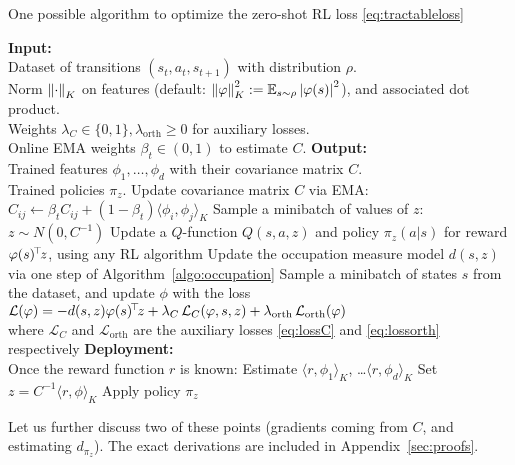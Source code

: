 \documentclass[11pt,a4paper]{article}
\newcommand{\loss}{\mathcal{L}}
\newcommand{\orth}{_\mathrm{orth}}
\begin{document}
\newcommand{\algindent}{\STATE\hspace{\algorithmicindent}}

  \begin{algorithm}[tb]
    \small
    \caption{One possible algorithm to optimize the zero-shot RL loss
    \eqref{eq:tractableloss}}
    \label{algo:main}
 \begin{algorithmic}
    \STATE \textbf{Input:}
    \\Dataset of transitions $(s_t,a_t,s_{t+1})$
    with distribution $\rho$.
    \\Norm $\left\lVert\cdot\right\rVert_K$ on features (default:
    $\left\lVert\varphi\right\rVert_K^2\mathrel{\mathop{:}}= \mathbb{E}_{s\sim \rho} \left\lvert\varphi(s)\right\rvert^2$), and
    associated dot product.
    \\Weights $\lambda_C\in \{0,1\}, \lambda\orth\geq0$ for auxiliary
    losses.
    \\Online EMA weights $\beta_t\in (0,1)$ to estimate $C$.
    \STATE \textbf{Output:}\\
    Trained features $\phi_1,\ldots,\phi_d$ with their covariance
    matrix $C$.
    \\Trained policies $\pi_z$.
    \STATE Update covariance matrix $C$ via EMA:
    $C_{ij}\gets \beta_t
    C_{ij}+(1-\beta_t)\langle \phi_i,\phi_j\rangle_K$
    \STATE Sample a minibatch of values of $z$: $z\sim N(0,C^{-1})$
    \STATE Update a $Q$-function $Q(s,a,z)$ and policy $\pi_z(a|s)$ for
    reward $\varphi(s)^{\!\top}\!z$, using any RL algorithm
    \STATE Update the occupation measure model $d(s,z)$ via one step of
    Algorithm~\ref{algo:occupation}
    \STATE Sample a minibatch of states $s$ from the dataset, and
    update $\phi$ with the loss
    \algindent $\loss(\phi)=-d(s,z)\transp{\phi(s)}z+\lambda_C\,
    \loss_C(\phi,s,z)+\lambda\orth\,\loss\orth(\phi)$
    \\where $\loss_C$ and $\loss\orth$ are the auxiliary losses
    \eqref{eq:lossC} and \eqref{eq:lossorth} respectively
    \ENDWHILE
    \STATE \textbf{Deployment:}
    \\Once the reward function $r$ is known:
    \STATE Estimate $\langle r,\phi_1\rangle_K$, \ldots $\langle
    r,\phi_d\rangle_K$
    \STATE Set $z=C^{-1}\langle r,\phi\rangle_K$
    \STATE Apply policy $\pi_z$
 \end{algorithmic}
 \end{algorithm}


Let us further discuss two of these points (gradients coming from $C$, and
estimating $d_{\pi_z}$). The exact derivations are included in
Appendix~\ref{sec:proofs}.
\end{document}
